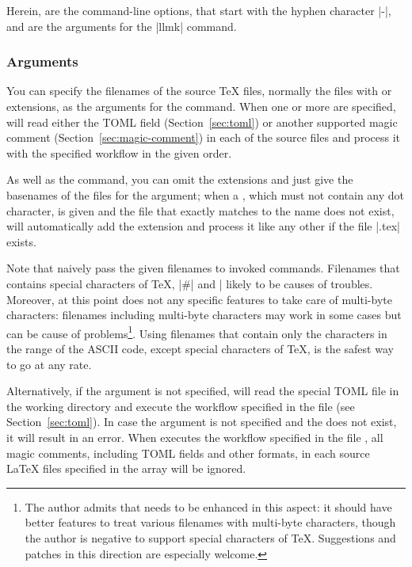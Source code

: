 \documentclass[draft]{llmk-doc}
\begin{document}
Herein,  are the command-line options, that start with the hyphen
character |-|, and  are the arguments for the |llmk| command.

\subsubsection*{Arguments }

You can specify the filenames of the source {\TeX} files, normally the files
with  or  extensions, as the arguments for the 
command. When one or more  are specified,  will read
either the TOML field (Section~\ref{sec:toml}) or another supported magic
comment (Section~\ref{sec:magic-comment}) in each of the source files and
process it with the specified workflow in the given order.

As well as the  command, you can omit the  extensions and
just give the basenames of the files for the argument; when a ,
which must not contain any dot character, is given and the file that exactly
matches to the name does not exist,  will automatically add the
 extension and process it like any other if the file
|.tex| exists.

Note that  naively pass the given filenames to invoked commands.
Filenames that contains special characters of {\TeX}, \eg |#| and |%
likely to be causes of troubles. Moreover, at this point  does not
any specific features to take care of multi-byte characters: filenames
including multi-byte characters may work in some cases but can be cause of
problems\footnote{The author admits that  needs to be enhanced in
this aspect: it should have better features to treat various filenames with
multi-byte characters, though the author is negative to support special
characters of {\TeX}. Suggestions and patches in this direction are especially
welcome.}. Using filenames that contain only the characters in the range of the
ASCII code, except special characters of {\TeX}, is the safest way to go at any
rate.

Alternatively, if the argument is not specified,  will read the
special TOML file  in the working directory and execute the
workflow specified in the file (see Section~\ref{sec:toml}). In case the
argument is not specified and the  does not exist, it will
result in an error. When  executes the workflow specified in the
file , all magic comments, including TOML fields and other
formats, in each source {\LaTeX} files specified in the  array
will be ignored.
\end{document}
